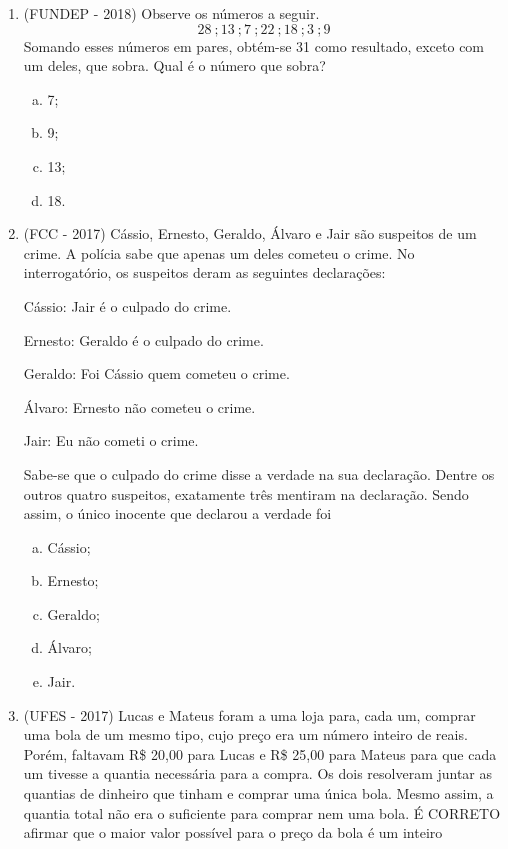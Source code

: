 \begin{enumerate}
\item (FUNDEP - 2018) Observe os números a seguir.
\[28 \ ; 13 \ ; 7 \ ; 22 \ ; 18 \ ; 3 \ ; 9 \]
Somando esses números em pares, obtém-se 31 como resultado, exceto com um deles, que sobra. Qual é o número que sobra?
\begin{multicols}{4}
\begin{enumerate}[a)]
\item 7;
\item 9;
\item 13;
\item 18.
\end{enumerate}
\end{multicols}

\item (FCC - 2017) Cássio, Ernesto, Geraldo, Álvaro e Jair são suspeitos de um crime. A polícia sabe que apenas um deles cometeu o crime. No interrogatório, os suspeitos deram as seguintes declarações:


Cássio: Jair é o culpado do crime.

Ernesto: Geraldo é o culpado do crime.

Geraldo: Foi Cássio quem cometeu o crime.

Álvaro: Ernesto não cometeu o crime.

Jair: Eu não cometi o crime.


Sabe-se que o culpado do crime disse a verdade na sua declaração. Dentre os outros quatro suspeitos, exatamente três mentiram na declaração. Sendo assim, o único inocente que declarou a verdade foi 
\begin{multicols}{2}
\begin{enumerate}[a)]
\item Cássio;
\item Ernesto;
\item Geraldo;
\item Álvaro;
\item Jair.
\end{enumerate}
\end{multicols}

\item (UFES - 2017) Lucas e Mateus foram a uma loja para, cada um, comprar uma bola de um mesmo tipo, cujo preço era um número inteiro de reais. Porém, faltavam R\$ 20,00 para Lucas e R\$ 25,00 para Mateus para que cada um tivesse a quantia necessária para a compra. Os dois resolveram juntar as quantias de dinheiro que tinham e comprar uma única bola. Mesmo assim, a quantia total não era o suficiente para comprar nem uma bola. É CORRETO afirmar que o maior valor possível para o preço da bola é um inteiro


\end{enumerate}

